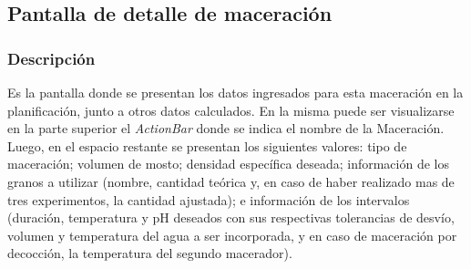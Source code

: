         \subsection{Pantalla de detalle de maceración}
        \label{DescripPantallaDetalleMaceración}
            \subsubsection{Descripción}
            Es la pantalla donde se presentan los datos ingresados para esta maceración en la planificación, junto a otros datos calculados.
            En la misma puede ser visualizarse en la parte superior el \textit{ActionBar} donde se indica el nombre de la Maceración. Luego, en el espacio restante se presentan los siguientes valores: tipo de maceración; volumen de mosto; densidad específica deseada; información de los granos a utilizar (nombre, cantidad teórica y, en caso de haber realizado mas de tres experimentos, la cantidad ajustada); e información de los intervalos (duración, temperatura y pH deseados con sus respectivas tolerancias de desvío, volumen y temperatura del agua a ser incorporada, y en caso de maceración por decocción, la temperatura del segundo macerador).
